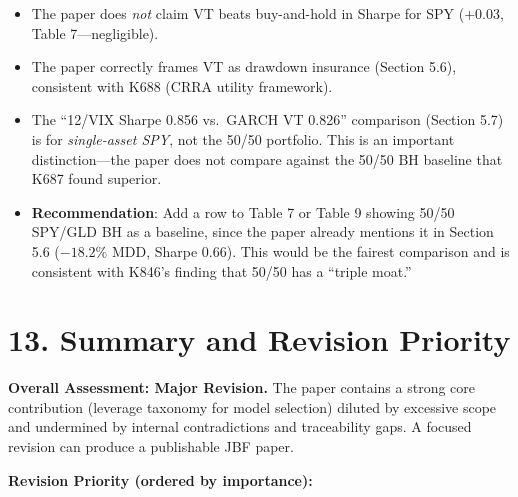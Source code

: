 \documentclass[12pt,a4paper]{article}
\begin{document}
\begin{itemize}[nosep]
\item The paper does \textit{not} claim VT beats buy-and-hold in Sharpe for SPY ($+0.03$, Table 7---negligible).
\item The paper correctly frames VT as drawdown insurance (Section 5.6), consistent with K688 (CRRA utility framework).
\item The ``12/VIX Sharpe 0.856 vs.\ GARCH VT 0.826'' comparison (Section 5.7) is for \textit{single-asset SPY}, not the 50/50 portfolio. This is an important distinction---the paper does not compare against the 50/50 BH baseline that K687 found superior.
\item \textbf{Recommendation}: Add a row to Table 7 or Table 9 showing 50/50 SPY/GLD BH as a baseline, since the paper already mentions it in Section 5.6 ($-18.2\%$ MDD, Sharpe 0.66). This would be the fairest comparison and is consistent with K846's finding that 50/50 has a ``triple moat.''
\end{itemize}

\bigskip

\section*{13. Summary and Revision Priority}

\textbf{Overall Assessment: Major Revision.} The paper contains a strong core contribution (leverage taxonomy for model selection) diluted by excessive scope and undermined by internal contradictions and traceability gaps. A focused revision can produce a publishable JBF paper.

\bigskip

\textbf{Revision Priority (ordered by importance):}
\end{document}
